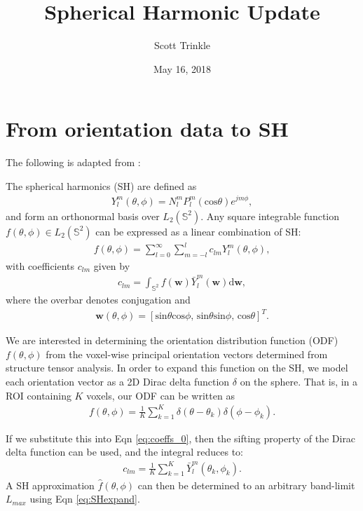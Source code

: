 \documentclass[11pt]{article}
\title{Spherical Harmonic Update}
\author{Scott Trinkle}
\date{May 16, 2018}
\begin{document}
\maketitle



\section{From orientation data to SH}
The following is adapted from \cite{Alimi2018}:\newline

The spherical harmonics (SH) are defined as
\begin{align}
  Y_l^m(\theta, \phi) = N_l^m P_l^m(\text{cos}\theta)e^{jm\phi},
\end{align}
and form an orthonormal basis over $L_2(\mathbb{S}^2)$. Any
square integrable function $f(\theta, \phi) \in L_2(\mathbb{S}^2)$ can
be expressed as a linear combination of SH:
\begin{align}
  f(\theta, \phi) = \sum_{l=0}^{\infty}\sum_{m=-l}^l c_{lm}Y_l^m(\theta, \phi),
  \label{eq:SHexpand}
\end{align}
with coefficients $c_{lm}$ given by
\begin{align}
  c_{lm} = \int_{\mathbb{S}^2} f(\bm{w}) \bar{Y}_l^m(\bm{w}) \mathrm{d}\bm{w},
  \label{eq:coeffs_0}
\end{align}
where the overbar denotes conjugation and
\begin{align}
  \bm{w}(\theta, \phi) = [\text{sin}\theta\text{cos}\phi\text{, }  \text{sin}\theta \text{sin}\phi\text{, }  \text{cos}\theta]^T.
\end{align}

We are interested in determining the orientation distribution function (ODF)
$f(\theta, \phi)$ from the voxel-wise principal orientation vectors determined
from structure tensor analysis. In order to expand this function on
the SH, we model each orientation vector as a 2D Dirac delta function
$\delta$ on the sphere. That is, in a ROI containing $K$ voxels, our ODF
can be written as
\begin{align}
  f(\theta, \phi) = \frac{1}{K}\sum_{k=1}^K \delta(\theta - \theta_k)\delta(\phi - \phi_k).
\end{align}

If we substitute this into Eqn \ref{eq:coeffs_0}, then the sifting property of the Dirac
delta function can be used, and the integral reduces to:
\begin{align}
  c_{lm} = \frac{1}{K}\sum_{k=1}^K \bar{Y}_l^m(\theta_k, \phi_k).
\end{align}
A SH approximation $\hat{f}(\theta, \phi)$ can then be determined to an arbitrary
band-limit $L_{max}$ using Eqn \ref{eq:SHexpand}.
\end{document}
